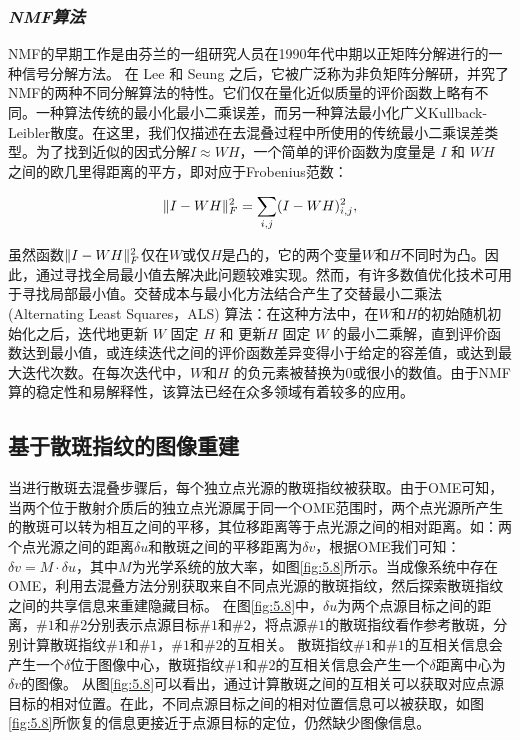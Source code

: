 \subsubsection*{\textbf{\textit{NMF算法}}}

NMF的早期工作是由芬兰的一组研究人员\cite{paatero_positive_1994}在1990年代中期以正矩阵分解进行的一种信号分解方法。 在 Lee 和 Seung 之后\cite{paatero_positive_1994}，它被广泛称为非负矩阵分解研，并究了NMF的两种不同分解算法的特性\cite{lee_learning_1999,lee_algorithms_2001}。它们仅在量化近似质量的评价函数上略有不同。一种算法传统的最小化最小二乘误差，而另一种算法最小化广义Kullback-Leibler散度。在这里，我们仅描述在去混叠过程中所使用的传统最小二乘误差类型。为了找到近似的因式分解$I \approx WH$，一个简单的评价函数为度量是 $I$ 和 $WH$ 之间的欧几里得距离的平方，即对应于Frobenius范数：

\begin{equation}
	\begin{aligned}
\Arrowvert I -WH\Arrowvert_F^{2} = \sum_{i,j} (I -WH)_{i,j}^2,
\label{eq:5.3}
\end{aligned}
\end{equation}

虽然函数$\Arrowvert I -WH\Arrowvert_F^{2}$仅在$W$或仅$H$是凸的，它的两个变量$W$和$H$不同时为凸。因此，通过寻找全局最小值去解决此问题较难实现。然而，有许多数值优化技术可用于寻找局部最小值。交替成本与最小化方法结合产生了交替最小二乘法 (Alternating Least Squares，ALS) 算法：在这种方法中，在$W$和$H$的初始随机初始化之后，迭代地更新 $W$ 固定 $H$ 和 更新$H$ 固定 $W$ 的最小二乘解，直到评价函数达到最小值，或连续迭代之间的评价函数差异变得小于给定的容差值，或达到最大迭代次数。在每次迭代中，$W$和$H$ 的负元素被替换为$0$或很小的数值。由于NMF算的稳定性和易解释性，该算法已经在众多领域有着较多的应用。

\subsection{基于散斑指纹的图像重建}

当进行散斑去混叠步骤后，每个独立点光源的散斑指纹被获取。由于OME\cite{Freund1988,katz_non-invasive_2014,bertolotti_non-invasive_2012}可知，当两个位于散射介质后的独立点光源属于同一个OME范围时，两个点光源所产生的散斑可以转为相互之间的平移，其位移距离等于点光源之间的相对距离。如：两个点光源之间的距离$\delta u$和散斑之间的平移距离为$\delta v$，根据OME我们可知：$\delta v = M \cdot \delta u$，其中$M$为光学系统的放大率，如图\ref{fig:5.8}所示。当成像系统中存在OME，利用去混叠方法分别获取来自不同点光源的散斑指纹，然后探索散斑指纹之间的共享信息来重建隐藏目标。
在图\ref{fig:5.8}中，$\delta u$为两个点源目标之间的距离，$\# 1$和$\# 2$分别表示点源目标$\# 1$和$\# 2$，将点源$\# 1$的散斑指纹看作参考散斑，分别计算散斑指纹$\# 1$和$\# 1$，$\# 1$和$\# 2$的互相关。
散斑指纹$\# 1$和$\# 1$的互相关信息会产生一个$\delta $位于图像中心，散斑指纹$\# 1$和$\# 2$的互相关信息会产生一个$\delta $距离中心为$\delta v$的图像。
从图\ref{fig:5.8}可以看出，通过计算散斑之间的互相关可以获取对应点源目标的相对位置。在此，不同点源目标之间的相对位置信息可以被获取，如图\ref{fig:5.8}所恢复的信息更接近于点源目标的定位，仍然缺少图像信息。

